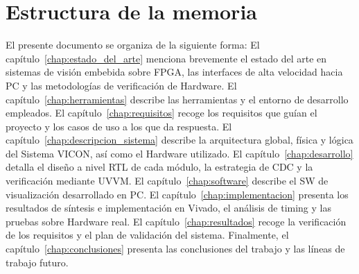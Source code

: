 \documentclass[../main.tex]{subfiles}
\begin{document}
\section{Estructura de la memoria} 
El presente documento se organiza de la siguiente forma: El capítulo~\ref{chap:estado_del_arte} menciona brevemente el estado del arte en sistemas de visión embebida sobre FPGA, las interfaces de alta velocidad hacia PC y las metodologías de verificación de Hardware. El capítulo~\ref{chap:herramientas} describe las herramientas y el entorno de desarrollo empleados. El capítulo~\ref{chap:requisitos} recoge los requisitos que guían el proyecto y los casos de uso a los que da respuesta. El capítulo~\ref{chap:descripcion_sistema} describe la arquitectura global, física y lógica del Sistema \ac{VICON}, así como el Hardware utilizado. El capítulo~\ref{chap:desarrollo} detalla el diseño a nivel \ac{RTL} de cada módulo, la estrategia de \ac{CDC} y la verificación mediante \ac{UVVM}. El capítulo~\ref{chap:software} describe el \ac{SW} de visualización desarrollado en PC. El capítulo~\ref{chap:implementacion} presenta los resultados de síntesis e implementación en Vivado, el análisis de timing y las pruebas sobre Hardware real. El capítulo~\ref{chap:resultados} recoge la verificación de los requisitos y el plan de validación del sistema. Finalmente, el capítulo~\ref{chap:conclusiones} presenta las conclusiones del trabajo y las líneas de trabajo futuro.
\end{document}
